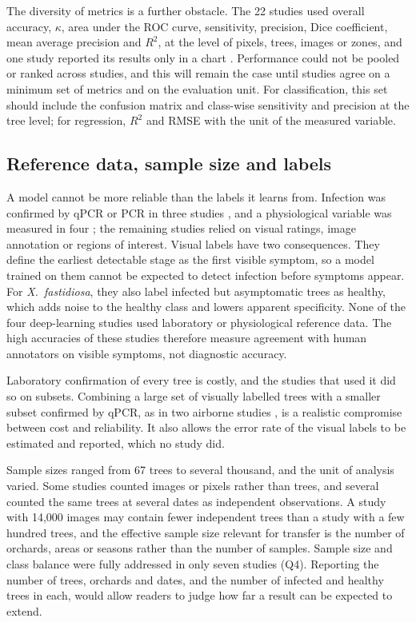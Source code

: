 \documentclass[preprint,12pt]{elsarticle}
\begin{document}
The diversity of metrics is a further obstacle. The 22 studies used overall accuracy, $\kappa$, area under the ROC curve, sensitivity, precision, Dice coefficient, mean average precision and $R^2$, at the level of pixels, trees, images or zones, and one study reported its results only in a chart \citep{u055}. Performance could not be pooled or ranked across studies, and this will remain the case until studies agree on a minimum set of metrics and on the evaluation unit. For classification, this set should include the confusion matrix and class-wise sensitivity and precision at the tree level; for regression, $R^2$ and RMSE with the unit of the measured variable.

\subsection{Reference data, sample size and labels}\label{sec:disc_reference}
A model cannot be more reliable than the labels it learns from. Infection was confirmed by qPCR or PCR in three studies \citep{u008,u030,u113}, and a physiological variable was measured in four \citep{u081,u106,u108,u133}; the remaining studies relied on visual ratings, image annotation or regions of interest. Visual labels have two consequences. They define the earliest detectable stage as the first visible symptom, so a model trained on them cannot be expected to detect infection before symptoms appear. For \textit{X.~fastidiosa}, they also label infected but asymptomatic trees as healthy, which adds noise to the healthy class and lowers apparent specificity. None of the four deep-learning studies used laboratory or physiological reference data. The high accuracies of these studies therefore measure agreement with human annotators on visible symptoms, not diagnostic accuracy.

Laboratory confirmation of every tree is costly, and the studies that used it did so on subsets. Combining a large set of visually labelled trees with a smaller subset confirmed by qPCR, as in two airborne studies \citep{u008,u030}, is a realistic compromise between cost and reliability. It also allows the error rate of the visual labels to be estimated and reported, which no study did.

Sample sizes ranged from 67 trees to several thousand, and the unit of analysis varied. Some studies counted images or pixels rather than trees, and several counted the same trees at several dates as independent observations. A study with 14{,}000 images may contain fewer independent trees than a study with a few hundred trees, and the effective sample size relevant for transfer is the number of orchards, areas or seasons rather than the number of samples. Sample size and class balance were fully addressed in only seven studies (Q4). Reporting the number of trees, orchards and dates, and the number of infected and healthy trees in each, would allow readers to judge how far a result can be expected to extend.
\end{document}
